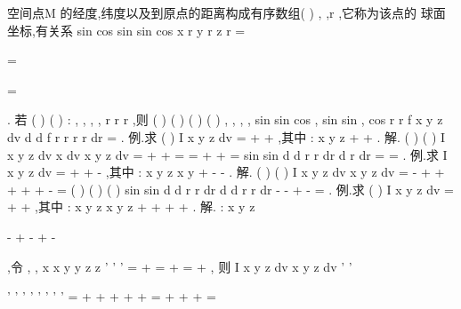 空间点M 的经度,纬度以及到原点的距离构成有序数组(
)
, ,r
\theta \varphi 
,它称为该点的 
\textcolor{lyred}{球面坐标},有关系
sin
cos
sin
sin
cos
x
r
y
r
z
r
\varphi 
\theta 
\varphi 
\theta 
\varphi 
=


=

=

. 
若
(
)
(
)
:
,
,
,
,
r
r
r
\theta 
\theta 
\theta \varphi 
\varphi 
\varphi 
\varphi \theta 
\varphi \theta 
\Omega 
\le 
\le 
\le 
\le 
\le 
\le 
,则 
(
)
(
)
(
)
(
)
,
,
, ,
sin
sin
cos , sin
sin , cos
r
r
f x y z dv
d
d
f r
r
r
r dr
\varphi \theta 
\theta 
\varphi 
\theta 
\varphi 
\varphi \theta 
\theta 
\varphi \varphi 
\varphi 
\theta 
\varphi 
\theta 
\varphi 
\Omega 
=
\int \int \int 
\int 
\int 
\int 
. 
\textcolor{lyred}{例}.求
(
)
I
x
y
z
dv
\Omega 
=
+
+
\int \int \int 
,其中
:
x
y
z
\Omega 
+
+
\le . 
解.
(
)
(
)
I
x
y
z
dv
x dv
x
y
z
dv
\Omega 
\Omega 
\Omega 
=
+
+
=
=
+
+
=
\int \int \int 
\int \int \int 
\int \int \int 
sin
sin
d
d
r
r dr
d
r dr
\pi 
\pi 
\pi 
\theta 
\varphi \varphi 
\pi 
\varphi \varphi 
\pi 
\cdots 
=
\cdots 
\cdots 
\cdots 
=
\int 
\int 
\int 
\int 
\int 
. 
\textcolor{lyred}{例}.求
I
x
y
z
dv
\Omega 
=
+
+
-
\int \int \int 
,其中
:
x
y
z
x
y
\Omega 
+
\le 
\le 
-
-
. 
解.
(
)
(
)
I
x
y
z
dv
x
y
z
dv
\Omega 
\Omega 
=
-
+
+
+
+
+
-
=
\int \int \int 
\int \int \int 
(
)
(
)
(
)
sin
sin
d
d
r r dr
d
d
r
r dr
\pi 
\pi 
\pi 
\pi 
\pi 
\theta 
\varphi \varphi 
\theta 
\varphi \varphi 
-
-
+
-
=
\int 
\int 
\int 
\int 
\int 
\int 
. 
\textcolor{lyred}{例}.求
(
)
I
x
y
z
dv
\Omega 
=
+
+
\int \int \int 
,其中
: x
y
z
x
y
z
\Omega 
+
+
\le 
+
+
. 
解.
:
x
y
z






\Omega 
-
+
-
+
-
\le 












,令
,
,
x
x
y
y
z
z
'
'
'
=
+
=
+
=
+
, 
则
I
x
y
z
dv
x
y
z
dv
'
'
\Omega 
\Omega 










'
'
'
'
'
'
'
'
=
+
+
+
+
+
=
+
+
+
=






















